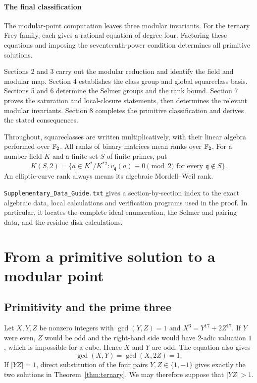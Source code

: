 \documentclass[11pt,a4paper]{article}
\theoremstyle{definition}\newtheorem{definition}[theorem]{Definition}
\theoremstyle{remark}\newtheorem{remark}[theorem]{Remark}
\newcommand{\file}[1]{\texttt{\nolinkurl{#1}}}
\begin{document}
\paragraph{The final classification} The modular-point computation leaves three modular invariants. For the ternary Frey family, each gives a rational equation of degree four. Factoring these equations and imposing the seventeenth-power condition determines all primitive solutions.

Sections 2 and 3 carry out the modular reduction and identify the field and modular map. Section 4 establishes the class group and global squareclass basis. Sections 5 and 6 determine the Selmer groups and the rank bound. Section 7 proves the saturation and local-closure statements, then determines the relevant modular invariants. Section 8 completes the primitive classification and derives the stated consequences.

Throughout, squareclasses are written multiplicatively, with their linear
algebra performed over $\mathbb F_2$. All ranks of binary matrices mean ranks over
$\mathbb F_2$. For a number field $K$ and a finite set $S$ of finite primes, put
\[
K(S,2)=\{a\in K^*/K^{*2}:v_{\mathfrak q}(a)\equiv0\pmod2
\text{ for every }\mathfrak q\notin S\}.
\]
An elliptic-curve rank always means its algebraic Mordell--Weil rank.

\file{Supplementary_Data_Guide.txt} gives a section-by-section index to the exact algebraic data, local calculations and verification programs used in the proof. In particular, it locates the complete ideal enumeration, the Selmer and pairing data, and the residue-disk calculations.

\section{From a primitive solution to a modular point}\label{sec:modular}

\subsection{Primitivity and the prime three}

Let $X,Y,Z$ be nonzero integers with $\gcd(Y,Z)=1$ and $X^3=Y^{17}+2Z^{17}$. If $Y$ were even, $Z$ would be odd and the right-hand side would have $2$-adic valuation $1$, which is impossible for a cube. Hence $X$ and $Y$ are odd. The equation also gives
\[
\gcd(X,Y)=\gcd(X,2Z)=1.
\]
If $|YZ|=1$, direct substitution of the four pairs $Y,Z\in\{1,-1\}$ gives exactly the two solutions in Theorem~\ref{thm:ternary}. We may therefore suppose that $|YZ|>1$.
\end{document}

